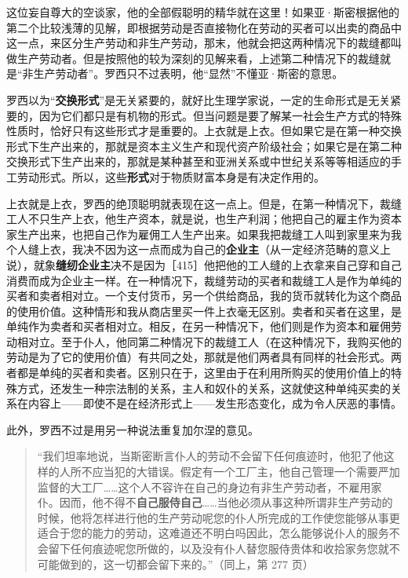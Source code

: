 这位妄自尊大的空谈家，他的全部假聪明的精华就在这里！如果亚·斯密根据他的第二个比较浅薄的见解，即根据劳动是否直接物化在劳动的买者可以出卖的商品中这一点，来区分生产劳动和非生产劳动，那末，他就会把这两种情况下的裁缝都叫做生产劳动者。但是按照他的较为深刻的见解来看，上述第二种情况下的裁缝就是“非生产劳动者”。罗西只不过表明，他“显然”不懂亚·斯密的意思。

罗西以为“\textbf{交换形式}”是无关紧要的，就好比生理学家说，一定的生命形式是无关紧要的，因为它们都只是有机物的形式。但当问题是要了解某一社会生产方式的特殊性质时，恰好只有这些形式才是重要的。上衣就是上衣。但如果它是在第一种交换形式下生产出来的，那就是资本主义生产和现代资产阶级社会；如果它是在第二种交换形式下生产出来的，那就是某种甚至和亚洲关系或中世纪关系等等相适应的手工劳动形式。所以，这些\textbf{形式}对于物质财富本身是有决定作用的。

上衣就是上衣，罗西的绝顶聪明就表现在这一点上。但是，在第一种情况下，裁缝工人不只生产上衣，他生产资本，就是说，也生产利润；他把自己的雇主作为资本家生产出来，也把自己作为雇佣工人生产出来。如果我把裁缝工人叫到家里来为我个人缝上衣，我决不因为这一点而成为自己的\textbf{企业主}（从一定经济范畴的意义上说），就象\textbf{缝纫企业主}决不是因为［415］他把他的工人缝的上衣拿来自己穿和自己消费而成为企业主一样。在一种情况下，裁缝劳动的买者和裁缝工人是作为单纯的买者和卖者相对立。一个支付货币，另一个供给商品，我的货币就转化为这个商品的使用价值。这种情形和我从商店里买一件上衣毫无区别。卖者和买者在这里，是单纯作为卖者和买者相对立。相反，在另一种情况下，他们则是作为资本和雇佣劳动相对立。至于仆人，他同第二种情况下的裁缝工人（在这种情况下，我购买他的劳动是为了它的使用价值）有共同之处，那就是他们两者具有同样的社会形式。两者都是单纯的买者和卖者。区别只在于，这里由于在利用所购买的使用价值上的特殊方式，还发生一种宗法制的关系，主人和奴仆的关系，这就使这种单纯买卖的关系在内容上——即使不是在经济形式上——发生形态变化，成为令人厌恶的事情。

此外，罗西不过是用另一种说法重复加尔涅的意见。

\begin{quote}“我们坦率地说，当斯密断言仆人的劳动不会留下任何痕迹时，他犯了他这样的人所不应当犯的大错误。假定有一个工厂主，他自己管理一个需要严加监督的大工厂……这个人不容许在自己的身边有非生产劳动者，不雇用家仆。因而，他不得不\textbf{自己服侍自己}……当他必须从事这种所谓非生产劳动的时候，他将怎样进行他的生产劳动呢您的仆人所完成的工作使您能够从事更适合于您的能力的劳动，这难道还不明白吗因此，怎么能够说仆人的服务不会留下任何痕迹呢您所做的，以及没有仆人替您服侍贵体和收拾家务您就不可能做到的，这一切都会留下来的。”（同上，第 277 页）\end{quote}

